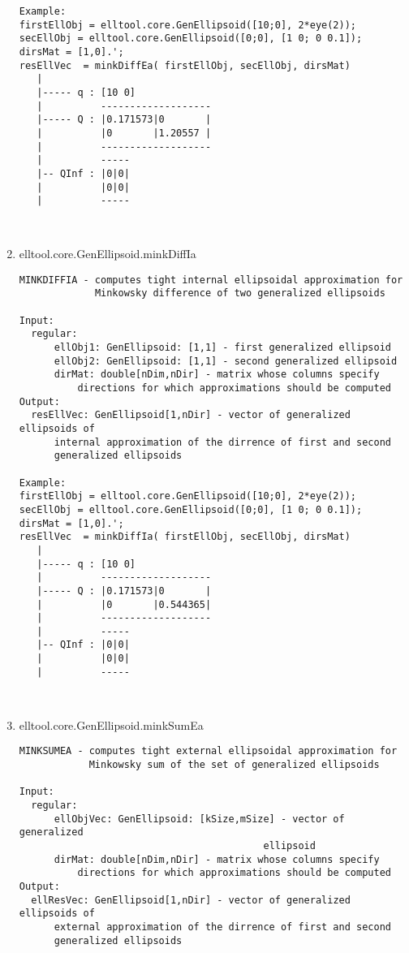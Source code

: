 \begin{enumerate}
\begin{lstlisting}
Example:
firstEllObj = elltool.core.GenEllipsoid([10;0], 2*eye(2));
secEllObj = elltool.core.GenEllipsoid([0;0], [1 0; 0 0.1]);
dirsMat = [1,0].';
resEllVec  = minkDiffEa( firstEllObj, secEllObj, dirsMat)
   |
   |----- q : [10 0]
   |          -------------------
   |----- Q : |0.171573|0       |
   |          |0       |1.20557 |
   |          -------------------
   |          -----
   |-- QInf : |0|0|
   |          |0|0|
   |          -----



\end{lstlisting}
\fontfamily{\familydefault}
\selectfont
\item {elltool.core.GenEllipsoid.minkDiffIa}
\selectfont
\begin{lstlisting}
MINKDIFFIA - computes tight internal ellipsoidal approximation for
             Minkowsky difference of two generalized ellipsoids

Input:
  regular:
      ellObj1: GenEllipsoid: [1,1] - first generalized ellipsoid
      ellObj2: GenEllipsoid: [1,1] - second generalized ellipsoid
      dirMat: double[nDim,nDir] - matrix whose columns specify
          directions for which approximations should be computed
Output:
  resEllVec: GenEllipsoid[1,nDir] - vector of generalized ellipsoids of
      internal approximation of the dirrence of first and second
      generalized ellipsoids

Example:
firstEllObj = elltool.core.GenEllipsoid([10;0], 2*eye(2));
secEllObj = elltool.core.GenEllipsoid([0;0], [1 0; 0 0.1]);
dirsMat = [1,0].';
resEllVec  = minkDiffIa( firstEllObj, secEllObj, dirsMat)
   |
   |----- q : [10 0]
   |          -------------------
   |----- Q : |0.171573|0       |
   |          |0       |0.544365|
   |          -------------------
   |          -----
   |-- QInf : |0|0|
   |          |0|0|
   |          -----



\end{lstlisting}
\fontfamily{\familydefault}
\selectfont
\item {elltool.core.GenEllipsoid.minkSumEa}
\selectfont
\begin{lstlisting}
MINKSUMEA - computes tight external ellipsoidal approximation for
            Minkowsky sum of the set of generalized ellipsoids

Input:
  regular:
      ellObjVec: GenEllipsoid: [kSize,mSize] - vector of  generalized
                                          ellipsoid
      dirMat: double[nDim,nDir] - matrix whose columns specify
          directions for which approximations should be computed
Output:
  ellResVec: GenEllipsoid[1,nDir] - vector of generalized ellipsoids of
      external approximation of the dirrence of first and second
      generalized ellipsoids


\end{lstlisting}
\end{enumerate}
